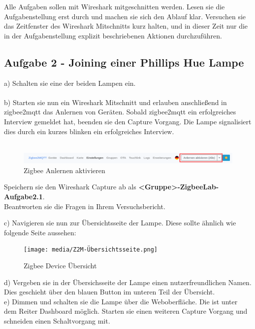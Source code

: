 \begin{Hinweis}
    Alle Aufgaben sollen mit Wireshark mitgeschnitten werden. Lesen sie die Aufgabenstellung erst durch und machen sie sich den Ablauf klar. Versuchen sie das 
    Zeitfenster des Wireshark Mitschnitts kurz halten, und in dieser Zeit nur die in der Aufgabenstellung explizit beschriebenen Aktionen durchzuführen.
\end{Hinweis}

\subsection{Aufgabe 2 - Joining einer Phillips Hue Lampe}
a) Schalten sie eine der beiden Lampen ein.\\\\
b) Starten sie nun ein Wireshark Mitschnitt und erlauben anschließend in zigbee2mqtt das Anlernen von Geräten. Sobald zigbee2mqtt ein erfolgreiches Interview gemeldet hat, 
beenden sie den Capture Vorgang. Die Lampe signalisiert dies durch ein kurzes blinken ein erfolgreiches Interview.\\\\

\begin{figure}[H]
    \centering
    \includegraphics[width=1\textwidth]{media/Z2M-Anlernen.png}
    \caption{Zigbee Anlernen aktivieren}
\end{figure}

\begin{Aufgabe}
    Speichern sie den Wireshark Capture ab als \textbf{\grqq <Gruppe>-ZigbeeLab-Aufgabe2.1\grqq{}}. \\
    Beantworten sie die Fragen in Ihrem Versuchsbericht.
\end{Aufgabe}

c) Navigieren sie nun zur Übersichtsseite der Lampe. Diese sollte ähnlich wie folgende Seite aussehen:

\begin{figure}[H]
    \centering
    \texttt{[image: media/Z2M-Übersichtsseite.png]}
    \caption{Zigbee Device Übersicht}
\end{figure}

d) Vergeben sie in der Übersichsseite der Lampe einen nutzerfreundlichen Namen. Dies geschieht über den blauen Button im unteren Teil der Übersicht.\\
e) Dimmen und schalten sie die Lampe über die Weboberfläche. Die ist unter dem Reiter \grqq Dashboard\grqq{} möglich. Starten sie einen weiteren Capture Vorgang und
schneiden einen Schaltvorgang mit.

